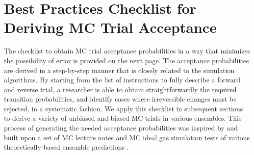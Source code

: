 \section{\label{sec:checklist}Best Practices Checklist for Deriving MC Trial Acceptance}

The checklist to obtain MC trial acceptance probabilities in a way that minimizes the possibility of error is provided on the next page.
The acceptance probabilities are derived in a step-by-step manner that is closely related to the simulation algorithms.
By starting from the list of instructions to fully describe a forward and reverse trial, a researcher is able to obtain straightforwardly the required transition probabilities, and identify cases where irreversible changes must be rejected, in a systematic fashion.
We apply this checklist in subsequent sections to derive a variety of unbiased and biased MC trials in various ensembles.
This process of generating the needed acceptance probabilities was inspired by and built upon a set of MC lecture notes \cite{kofke_lecture9_2024} and MC ideal gas simulation tests of various theoretically-based ensemble predictions \cite{hatch_theory_2024}.

